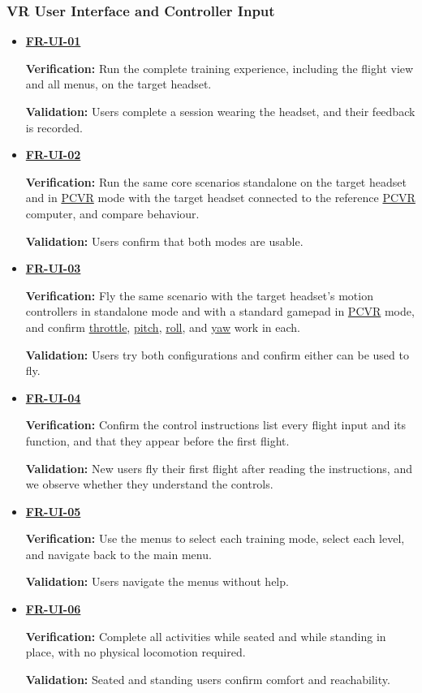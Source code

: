 \documentclass[12pt]{article}
\begin{document}
\subsubsection{VR User Interface and Controller Input}
\begin{itemize}
\item \hyperlink{req:FR-UI-01}{\textbf{FR-UI-01}}\par
 \textbf{Verification:} Run the complete training experience, including the
 flight view and all menus, on the target headset.\par
 \textbf{Validation:} Users complete a session wearing the headset, and their
 feedback is recorded.
\item \hyperlink{req:FR-UI-02}{\textbf{FR-UI-02}}\par
 \textbf{Verification:} Run the same core scenarios standalone on the
 target headset and in \hyperlink{glos:PCVR}{PCVR} mode with the target headset connected to the
 reference \hyperlink{glos:PCVR}{PCVR} computer, and compare behaviour.\par
 \textbf{Validation:} Users confirm that both modes are usable.
\item \hyperlink{req:FR-UI-03}{\textbf{FR-UI-03}}\par
 \textbf{Verification:} Fly the same scenario with the target headset's
 motion controllers in standalone mode and with a standard gamepad in \hyperlink{glos:PCVR}{PCVR}
 mode, and confirm \hyperlink{glos:Throttle}{throttle}, \hyperlink{glos:Throttle}{pitch}, \hyperlink{glos:Throttle}{roll}, and \hyperlink{glos:Throttle}{yaw} work in each.\par
 \textbf{Validation:} Users try both configurations and confirm either can be
 used to fly.
\item \hyperlink{req:FR-UI-04}{\textbf{FR-UI-04}}\par
 \textbf{Verification:} Confirm the control instructions list every flight
 input and its function, and that they appear before the first flight.\par
 \textbf{Validation:} New users fly their first flight after reading the
 instructions, and we observe whether they understand the controls.
\item \hyperlink{req:FR-UI-05}{\textbf{FR-UI-05}}\par
 \textbf{Verification:} Use the menus to select each training mode,
 select each level, and navigate back to the main menu.\par
 \textbf{Validation:} Users navigate the menus without help.
\item \hyperlink{req:FR-UI-06}{\textbf{FR-UI-06}}\par
 \textbf{Verification:} Complete all activities while seated and while
 standing in place, with no physical locomotion required.\par
 \textbf{Validation:} Seated and standing users confirm comfort and reachability.
\end{itemize}
\end{document}
